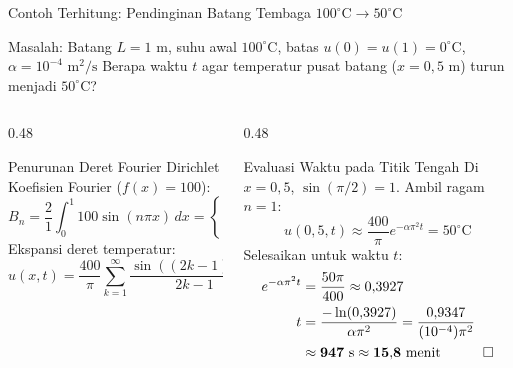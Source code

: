 \documentclass[aspectratio=169,10pt]{beamer}
\begin{document}
\begin{frame}{Contoh Terhitung: Pendinginan Batang Tembaga $100^\circ\text{C} \to 50^\circ\text{C}$}
  \begin{exampleblock}{Masalah: Batang $L = 1\text{ m}$, suhu awal $100^\circ\text{C}$, batas $u(0)=u(1)=0^\circ\text{C}$, $\alpha = 10^{-4}\text{ m}^2/\text{s}$}
    Berapa waktu $t$ agar temperatur pusat batang ($x = 0{,}5\text{ m}$) turun menjadi $50^\circ\text{C}$?
  \end{exampleblock}
  \begin{columns}[t]
    \begin{column}{0.48\textwidth}
      \begin{block}{Penurunan Deret Fourier Dirichlet}
        \small
        Koefisien Fourier ($f(x) = 100$):
        \begin{equation*}
          B_n = \frac{2}{1}\int_{0}^{1} 100\sin(n\pi x)\,dx = \begin{cases} \frac{400}{n\pi}, & n \text{ ganjil} \\ 0, & n \text{ genap} \end{cases}
        \end{equation*}
        Ekspansi deret temperatur:
        \begin{equation*}
          u(x, t) = \frac{400}{\pi}\sum_{k=1}^{\infty}\frac{\sin((2k-1)\pi x)}{2k-1} e^{-\alpha (2k-1)^2 \pi^2 t}
        \end{equation*}
      \end{block}
    \end{column}
    \begin{column}{0.48\textwidth}
      \begin{alertblock}{Evaluasi Waktu pada Titik Tengah}
        \small
        Di $x = 0{,}5$, $\sin(\pi / 2) = 1$. Ambil ragam $n = 1$:
        \begin{equation*}
          u(0{,}5, t) \approx \frac{400}{\pi} e^{-\alpha \pi^2 t} = 50^\circ\text{C}
        \end{equation*}
        Selesaikan untuk waktu $t$:
        \begin{align*}
          e^{-\alpha \pi^2 t} &= \frac{50\pi}{400} \approx 0{,}3927 \\
          t &= \frac{-\ln(0{,}3927)}{\alpha \pi^2} = \frac{0{,}9347}{(10^{-4})\pi^2} \\
          &\approx \mathbf{947\text{ s}} \approx \mathbf{15{,}8\text{ menit}} \quad \qed
        \end{align*}
      \end{alertblock}
    \end{column}
  \end{columns}
\end{frame}
\end{document}
